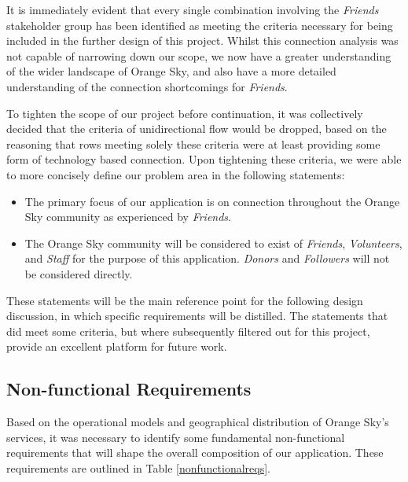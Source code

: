 It is immediately evident that every single combination involving the \emph{Friends} stakeholder group has been identified as meeting the criteria necessary for being included in the further design of this project. Whilst this connection analysis was not capable of narrowing down our scope, we now have a greater understanding of the wider landscape of Orange Sky, and also have a more detailed understanding of the connection shortcomings for \emph{Friends}.

To tighten the scope of our project before continuation, it was collectively decided that the criteria of unidirectional flow would be dropped, based on the reasoning that rows meeting solely these criteria were at least providing some form of technology based connection. Upon tightening these criteria, we were able to more concisely define our problem area in the following statements:

\begin{itemize}
    \item The primary focus of our application is on connection throughout the Orange Sky community as experienced by \emph{Friends}.
    \item The Orange Sky community will be considered to exist of \emph{Friends}, \emph{Volunteers}, and \emph{Staff} for the purpose of this application. \emph{Donors} and \emph{Followers} will not be considered directly.
\end{itemize}

These statements will be the main reference point for the following design discussion, in which specific requirements will be distilled. The statements that did meet some criteria, but where subsequently filtered out for this project, provide an excellent platform for future work.

\subsection{Non-functional Requirements}

Based on the operational models and geographical distribution of Orange Sky's services, it was necessary to identify some fundamental non-functional requirements that will shape the overall composition of our application. These requirements are outlined in Table \ref{nonfunctionalreqs}.

